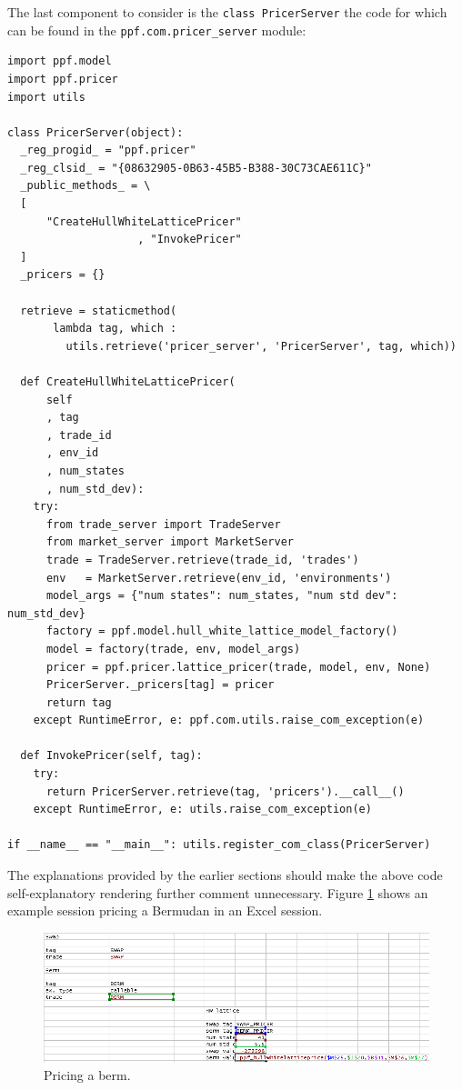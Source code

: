 The last component to consider is the \verb|class PricerServer| the
code for which can be found in the \verb|ppf.com.pricer_server|
module:
\begin{verbatim}
import ppf.model
import ppf.pricer
import utils

class PricerServer(object):
  _reg_progid_ = "ppf.pricer"
  _reg_clsid_ = "{08632905-0B63-45B5-B388-30C73CAE611C}"
  _public_methods_ = \
  [
      "CreateHullWhiteLatticePricer"
                    , "InvokePricer"
  ]
  _pricers = {}

  retrieve = staticmethod(
       lambda tag, which :
         utils.retrieve('pricer_server', 'PricerServer', tag, which))

  def CreateHullWhiteLatticePricer(
      self
      , tag
      , trade_id
      , env_id
      , num_states
      , num_std_dev):
    try:
      from trade_server import TradeServer
      from market_server import MarketServer
      trade = TradeServer.retrieve(trade_id, 'trades')
      env   = MarketServer.retrieve(env_id, 'environments')
      model_args = {"num states": num_states, "num std dev": num_std_dev} 
      factory = ppf.model.hull_white_lattice_model_factory()
      model = factory(trade, env, model_args)
      pricer = ppf.pricer.lattice_pricer(trade, model, env, None)
      PricerServer._pricers[tag] = pricer
      return tag
    except RuntimeError, e: ppf.com.utils.raise_com_exception(e)

  def InvokePricer(self, tag):
    try:
      return PricerServer.retrieve(tag, 'pricers').__call__()
    except RuntimeError, e: utils.raise_com_exception(e)

if __name__ == "__main__": utils.register_com_class(PricerServer)
\end{verbatim}
The explanations provided by the earlier sections should make the
above code self-explanatory rendering further comment unnecessary.
Figure \ref{fig:price-bermudan} shows an example session pricing a
Bermudan in an Excel session.
\begin{figure} \centering
\includegraphics[scale=0.5]{img/pricer_server.PNG}
\caption{Pricing a berm.}
\label{fig:price-bermudan}
\end{figure}

